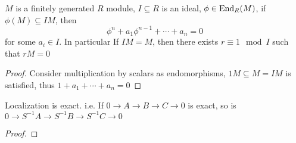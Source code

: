 \documentclass[main]{subfiles}
\begin{document}
\begin{lemma}\label{Nakayama's lemma}
$M$ is a finitely generated $R$ module, $I\subseteq R$ is an ideal, $\phi\in\operatorname{End}_R(M)$, if $\phi(M)\subseteq IM$, then
\[\phi^n+a_{1}\phi^{n-1}+\cdots+a_n=0\]
for some $a_i\in I$. In particular If $IM=M$, then there exists $r\equiv1\mod I$ such that $rM=0$
\end{lemma}

\begin{proof}
Consider multiplication by scalars as endomorphisms, $1M\subseteq M=IM$ is satisfied, thus $1+a_1+\cdots+a_n=0$
\end{proof}

\begin{proposition}
Localization is exact. i.e. If $0\to A\to B\to C\to0$ is exact, so is $0\to S^{-1}A\to S^{-1}B\to S^{-1}C\to 0$
\end{proposition}

\begin{proof}

\end{proof}
\end{document}
